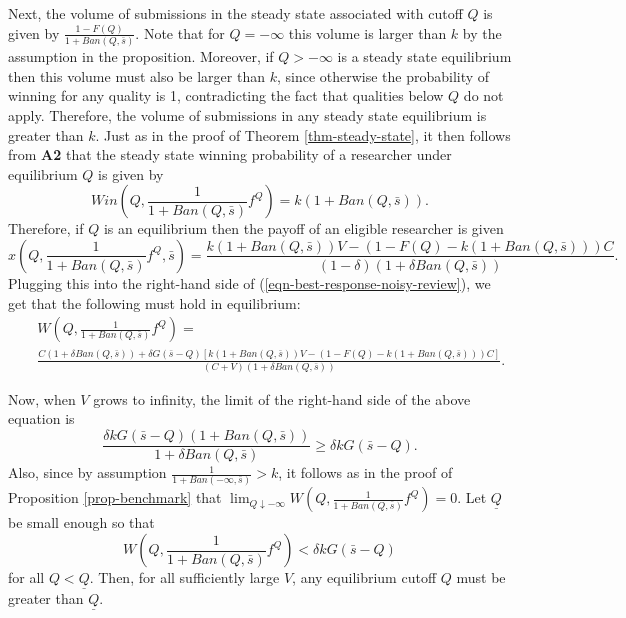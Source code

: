 \documentclass[12pt]{article}
\theoremstyle{plain}
\theoremstyle{definition}
\theoremstyle{remark}
\begin{document}
    Next, the volume of submissions in the steady state associated with cutoff $Q$ is given by $\frac{1-F(Q)}{1+Ban(Q,\bar s)}$. Note that for $Q=-\infty$ this volume is larger than $k$ by the assumption in the proposition. Moreover, if $Q>-\infty$ is a steady state equilibrium then this volume must also be larger than $k$, since otherwise the probability of winning for any quality is 1, contradicting the fact that qualities below $Q$ do not apply. Therefore, the volume of submissions in any steady state equilibrium is greater than $k$. Just as in the proof of Theorem \ref{thm-steady-state}, it then follows from \textbf{A2} that the steady state winning probability of a researcher under equilibrium $Q$ is given by
    $$Win \left(Q,\frac{1}{1+Ban(Q,\bar s)}f^Q \right) = k(1+Ban(Q,\bar s)).$$
    Therefore, if $Q$ is an equilibrium then the payoff of an eligible researcher is given 
    $$x\left(Q,\frac{1}{1+Ban(Q,\bar s)}f^Q ,\bar s\right) = \frac{k(1+Ban(Q,\bar s))V-(1-F(Q)- k(1+Ban(Q,\bar s)))C}{(1-\delta)(1+\delta Ban(Q,\bar s))}.$$
    Plugging this into the right-hand side of (\ref{eqn-best-response-noisy-review}), we get that the following must hold in equilibrium:
    \begin{eqnarray*}
    & &   W\left(Q,\frac{1}{1+Ban(Q,\bar s)}f^Q\right) = \\
    & &   \frac{C(1+\delta Ban(Q,\bar s))+\delta G(\bar s-Q)\left[k(1+Ban(Q,\bar s))V-(1-F(Q)- k(1+Ban(Q,\bar s)))C\right]}{(C+V)(1+\delta Ban(Q,\bar s))}.
    \end{eqnarray*}

    Now, when $V$ grows to infinity, the limit of the right-hand side of the above equation is 
    $$\frac{\delta k G(\bar s-Q)(1+Ban(Q,\bar s))}{1+\delta Ban(Q,\bar s)}\ge \delta k G(\bar s-Q).$$
    Also, since by assumption $\frac{1}{1+Ban(-\infty,\bar s)}>k$, it follows as in the proof of Proposition \ref{prop-benchmark} that $\lim_{Q\downarrow -\infty} W\left(Q,\frac{1}{1+Ban(Q,\bar s)}f^Q\right)=0$. Let $\underline{Q}$ be small enough so that 
    $$ W\left(Q,\frac{1}{1+Ban(Q,\bar s)}f^Q\right) < \delta k G(\bar s-Q)$$ 
    for all $Q<\underline{Q}$. Then, for all sufficiently large $V$, any equilibrium cutoff $Q$ must be greater than $\underline{Q}$.
    
\end{document}
